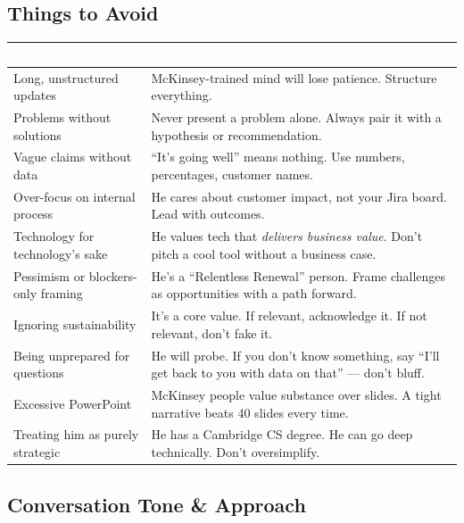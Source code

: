 \documentclass[11pt,a4paper]{article}
\begin{document}
\subsection{Things to Avoid}

\begin{center}
\begin{longtable}{L{4.5cm}L{9cm}}
\toprule
{}
\textcolor{white}{\textbf{Don't}} & \textcolor{white}{\textbf{Why}} \\
\midrule
Long, unstructured updates & McKinsey-trained mind will lose patience. Structure everything. \\
Problems without solutions & Never present a problem alone. Always pair it with a hypothesis or recommendation. \\
Vague claims without data & ``It's going well'' means nothing. Use numbers, percentages, customer names. \\
Over-focus on internal process & He cares about customer impact, not your Jira board. Lead with outcomes. \\
Technology for technology's sake & He values tech that \textit{delivers business value}. Don't pitch a cool tool without a business case. \\
Pessimism or blockers-only framing & He's a ``Relentless Renewal'' person. Frame challenges as opportunities with a path forward. \\
Ignoring sustainability & It's a core value. If relevant, acknowledge it. If not relevant, don't fake it. \\
Being unprepared for questions & He will probe. If you don't know something, say ``I'll get back to you with data on that'' --- don't bluff. \\
Excessive PowerPoint & McKinsey people value substance over slides. A tight narrative beats 40 slides every time. \\
Treating him as purely strategic & He has a Cambridge CS degree. He can go deep technically. Don't oversimplify. \\
\bottomrule
\end{longtable}
\end{center}

\subsection{Conversation Tone \& Approach}
\end{document}
